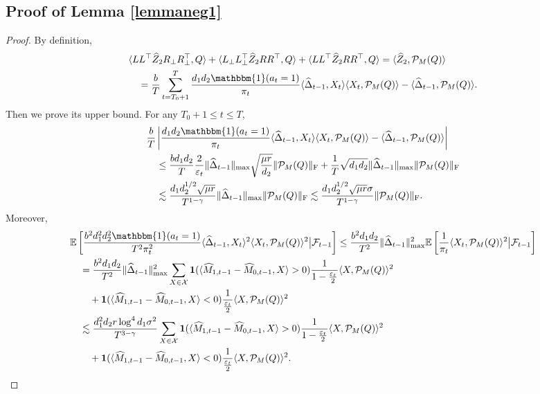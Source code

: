 \documentclass[12pt]{article}
\newcommand\fro[1]{\| #1 \|_{\rm{F}}}
\newcommand{\inp}[2]{\langle #1,#2\rangle}
\def\EE{{\mathbb E}}
\def\indicator{\mathbf{1}}
\theoremstyle{plain}
\begin{document}
\subsection{Proof of Lemma \ref{lemmaneg1}}
\begin{proof}
    By definition,
    \begin{align*}
       &\inp{LL^{\top}\widehat{Z}_2R_{\perp}R_{\perp}^{\top}}{Q} + \inp{L_{\perp}L_{\perp}^{\top}\widehat{Z}_2RR^{\top}}{Q} + \inp{LL^{\top}\widehat{Z}_2RR^{\top}}{Q} = \inp{\widehat{Z}_2}{\mathcal{P}_M(Q)} \\
       &\quad = \frac{b}{T}\sum_{t=T_0+1}^{T}\frac{d_1d_2\mathbbm{1}(a_t=1)}{\pi_t}\inp{\widehat{\Delta}_{t-1}}{X_t}\inp{X_t}{\mathcal{P}_M(Q)}-\inp{\widehat{\Delta}_{t-1}}{\mathcal{P}_M(Q)}.
    \end{align*}
    Then we prove its upper bound. For any $T_0+1\leq t\leq T$,
    \begin{align*}
        &\frac{b}{T}\left|\frac{d_1d_2\mathbbm{1}(a_t=1)}{\pi_t}\inp{\widehat{\Delta}_{t-1}}{X_t}\inp{X_t}{\mathcal{P}_M(Q)}-\inp{\widehat{\Delta}_{t-1}}{\mathcal{P}_M(Q)}\right| \\
        &\quad \leq \frac{bd_1d_2}{T}\frac{2}{\varepsilon_t}\|\widehat{\Delta}_{t-1}\|_{\max}\sqrt{\frac{\mu r}{d_2}}\fro{\mathcal{P}_M(Q)} + \frac{1}{T}\sqrt{d_1d_2}\|\widehat{\Delta}_{t-1}\|_{\max}\fro{\mathcal{P}_M(Q)} \\
        &\quad \lesssim  \frac{d_1d_2^{1/2}\sqrt{\mu r}}{T^{1-\gamma}}\|\widehat{\Delta}_{t-1}\|_{\max}\fro{\mathcal{P}_M(Q)} \lesssim \frac{d_1d_2^{1/2}\sqrt{\mu r}\sigma}{T^{1-\gamma}}\fro{\mathcal{P}_M(Q)}.
    \end{align*}
    Moreover,
    \begin{align*}
        &\EE\left[\frac{b^2d_1^2d_2^2\mathbbm{1}(a_t=1)}{T^2\pi_t^2}\inp{\widehat{\Delta}_{t-1}}{X_t}^2\inp{X_t}{\mathcal{P}_M(Q)}^2\big|\mathcal{F}_{t-1}\right] \leq \frac{b^2d_1d_2}{T^2}\|\widehat{\Delta}_{t-1}\|_{\max}^2 \EE\left[\frac{1}{\pi_t} \inp{X_t}{\mathcal{P}_M(Q)}^2\big|\mathcal{F}_{t-1}\right] \\
        &\quad = \frac{b^2d_1d_2}{T^2}\|\widehat{\Delta}_{t-1}\|_{\max}^2 \sum_{X\in \mathcal{X}} \indicator(\inp{\widehat{M}_{1,t-1}-\widehat{M}_{0,t-1}}{X}>0)\frac{1}{1-\frac{\varepsilon_t}{2}}\inp{X}{\mathcal{P}_M(Q)}^2 \\ &\quad\quad +  \indicator(\inp{\widehat{M}_{1,t-1}-\widehat{M}_{0,t-1}}{X}<0)\frac{1}{\frac{\varepsilon_t}{2}}\inp{X}{\mathcal{P}_M(Q)}^2 \\
        &\quad  \lesssim \frac{d_1^2d_2r\log^4 d_1\sigma^2}{T^{3-\gamma}} \sum_{X\in \mathcal{X}} \indicator(\inp{\widehat{M}_{1,t-1}-\widehat{M}_{0,t-1}}{X}>0)\frac{1}{1-\frac{\varepsilon_t}{2}}\inp{X}{\mathcal{P}_M(Q)}^2 \\ &\quad\quad +  \indicator(\inp{\widehat{M}_{1,t-1}-\widehat{M}_{0,t-1}}{X}<0)\frac{1}{\frac{\varepsilon_t}{2}}\inp{X}{\mathcal{P}_M(Q)}^2.

\end{align*}
\end{proof}
\end{document}
